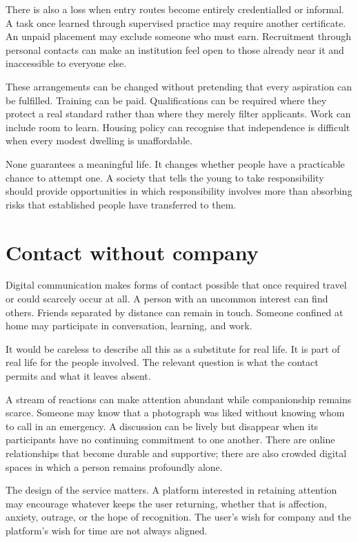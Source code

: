 \documentclass[12pt,a4paper]{book}
\begin{document}
There is also a loss when entry routes become entirely credentialled or informal. A task once learned through supervised practice may require another certificate. An unpaid placement may exclude someone who must earn. Recruitment through personal contacts can make an institution feel open to those already near it and inaccessible to everyone else.

These arrangements can be changed without pretending that every aspiration can be fulfilled. Training can be paid. Qualifications can be required where they protect a real standard rather than where they merely filter applicants. Work can include room to learn. Housing policy can recognise that independence is difficult when every modest dwelling is unaffordable.

None guarantees a meaningful life. It changes whether people have a practicable chance to attempt one. A society that tells the young to take responsibility should provide opportunities in which responsibility involves more than absorbing risks that established people have transferred to them.

\section*{Contact without company}

Digital communication makes forms of contact possible that once required travel or could scarcely occur at all. A person with an uncommon interest can find others. Friends separated by distance can remain in touch. Someone confined at home may participate in conversation, learning, and work.

It would be careless to describe all this as a substitute for real life. It is part of real life for the people involved. The relevant question is what the contact permits and what it leaves absent.

A stream of reactions can make attention abundant while companionship remains scarce. Someone may know that a photograph was liked without knowing whom to call in an emergency. A discussion can be lively but disappear when its participants have no continuing commitment to one another. There are online relationships that become durable and supportive; there are also crowded digital spaces in which a person remains profoundly alone.

The design of the service matters. A platform interested in retaining attention may encourage whatever keeps the user returning, whether that is affection, anxiety, outrage, or the hope of recognition. The user's wish for company and the platform's wish for time are not always aligned.
\end{document}

